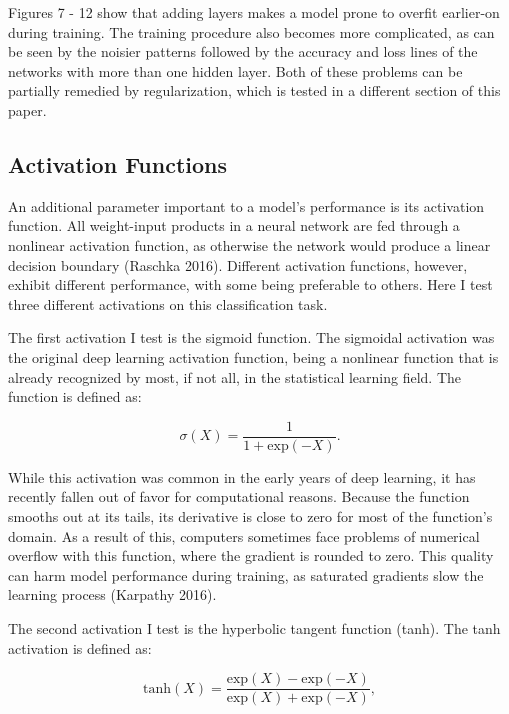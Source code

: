 \documentclass[12pt]{article}  %
\theoremstyle{definition}
\theoremstyle{remark}
\begin{document}
\par  Figures 7 - 12 show that adding layers makes a model prone to overfit earlier-on during training. The training procedure also becomes more complicated, as can be seen by the noisier patterns followed by the accuracy and loss lines of the networks with more than one hidden layer. Both of these problems can be partially remedied by regularization, which is tested in a different section of this paper. 

\subsection{Activation Functions}

\par An additional parameter important to a model's performance is its activation function. All weight-input products in a neural network are fed through a nonlinear activation function, as otherwise the network would produce a linear decision boundary (Raschka 2016). Different activation functions, however, exhibit different performance, with some being preferable to others. Here I test three different activations on this classification task.
\par The first activation I test is the sigmoid function. The sigmoidal activation was the original deep learning activation function, being a nonlinear function that is already recognized by most, if not all, in the statistical learning field. The function is defined as:

$$\sigma{(X)} = \frac{1}{1+\text{exp}(-X)}.$$

\par While this activation was common in the early years of deep learning, it has recently fallen out of favor for computational reasons. Because the function smooths out at its tails, its derivative is close to zero for most of the function's domain. As a result of this, computers sometimes face problems of numerical overflow with this function, where the gradient is rounded to zero. This quality can harm model performance during training, as saturated gradients slow the learning process (Karpathy 2016). 
\par The second activation I test is the hyperbolic tangent function (tanh). The tanh activation is defined as:

$$\text{tanh}(X)=\frac{\text{exp}(X)-\text{exp}(-X)}{\text{exp}(X)+\text{exp}(-X)}, $$
\end{document}

